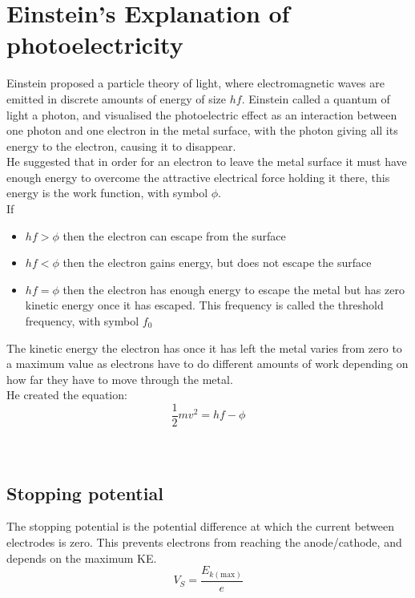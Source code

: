 \documentclass[12pt]{article}
\begin{document}
\section{Einstein's Explanation of photoelectricity}
Einstein proposed a particle theory of light, where electromagnetic waves are emitted in discrete amounts of energy of size $hf$. Einstein called a quantum of light a photon, and visualised the photoelectric effect as an interaction between one photon and one electron in the metal surface, with the photon giving all its energy to the electron, causing it to disappear.\\
He suggested that in order for an electron to leave the metal surface it must have enough energy to overcome the attractive electrical force holding it there, this energy is the work function, with symbol $\phi$. \\
If 
\begin{itemize}
\item $hf>\phi$ then the electron can escape from the surface
\item $hf<\phi$ then the electron gains energy, but does not escape the surface
\item $hf=\phi$ then the electron has enough energy to escape the metal but has zero kinetic energy once it has escaped. This frequency is called the threshold frequency, with symbol $f_0$
\end{itemize}
The kinetic energy the electron has once it has left the metal varies from zero to a maximum value as electrons have to do different amounts of work depending on how far they have to move through the metal.\\
He created the equation:
$$\frac{1}{2}mv^2=hf-\phi$$
\\
\\
\subsection{Stopping potential}
The stopping potential is the potential difference at which the current between electrodes is zero. This prevents electrons from reaching the anode/cathode, and depends on the maximum KE.\\
{\large
$$V_S=\frac{E_{k(\textrm{max})}}{e}$$}
\end{document}
